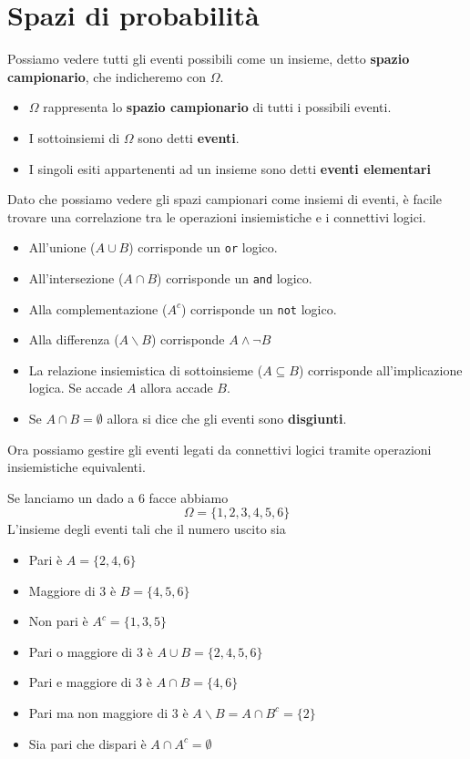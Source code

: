 \section{Spazi di probabilità}
Possiamo vedere tutti gli eventi possibili come un insieme, detto \textbf{spazio campionario}, che
indicheremo con $\Omega$.
\begin{itemize}
	\item $\Omega$ rappresenta lo \textbf{spazio campionario} di tutti i possibili eventi.
	\item I sottoinsiemi di $\Omega$ sono detti \textbf{eventi}.
	\item I singoli esiti appartenenti ad un insieme sono detti \textbf{eventi elementari}
\end{itemize}
Dato che possiamo vedere gli spazi campionari come insiemi di eventi, è facile trovare una
correlazione tra le operazioni insiemistiche e i connettivi logici.
\begin{itemize}
	\item All'unione ($A \cup B$) corrisponde un \verb|or| logico.
	\item All'intersezione ($A \cap B$) corrisponde un \verb|and| logico.
	\item Alla complementazione ($A^c$) corrisponde un \verb|not| logico.
	\item Alla differenza ($A \backslash B$) corrisponde $A \land \lnot B$
	\item La relazione insiemistica di sottoinsieme ($A \subseteq B$) corrisponde
	      all'implicazione logica. Se accade $A$ allora accade $B$.
	\item Se $A \cap B = \emptyset$ allora si dice che gli eventi sono \textbf{disgiunti}.
\end{itemize}
Ora possiamo gestire gli eventi legati da connettivi logici tramite operazioni insiemistiche
equivalenti.

\begin{example}
	Se lanciamo un dado a 6 facce abbiamo
	\[ \Omega = \{ 1, 2, 3, 4, 5, 6 \} \]
	L'insieme degli eventi tali che il numero uscito sia
	\begin{itemize}
		\item Pari è $A = \{ 2, 4, 6 \}$
		\item Maggiore di 3 è $B = \{ 4, 5, 6 \}$
		\item Non pari è $A^c = \{ 1, 3, 5 \}$
		\item Pari o maggiore di 3 è $A \cup B = \{ 2, 4, 5, 6 \}$
		\item Pari e maggiore di 3 è $A \cap B = \{ 4, 6 \}$
		\item Pari ma non maggiore di 3 è $A \backslash B = A \cap B^c = \{2\}$
		\item Sia pari che dispari è $A \cap A^c = \emptyset$
	\end{itemize}
\end{example}


